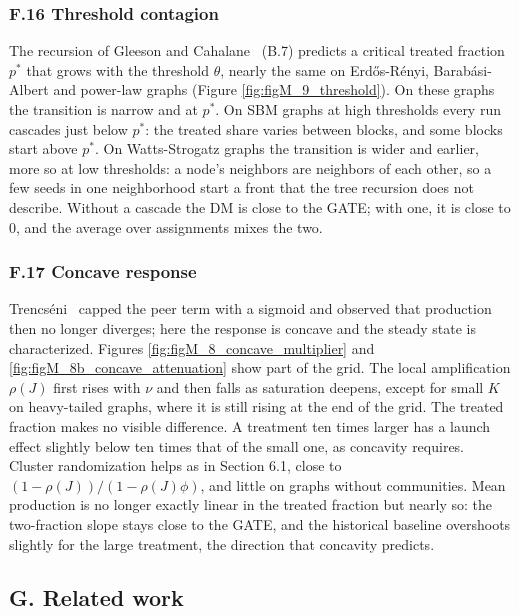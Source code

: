\documentclass[final,5p,times,twocolumn,number]{elsarticle}
\begin{document}
\subsubsection*{F.16 Threshold contagion}

The recursion of Gleeson and Cahalane~\cite{r10} (B.7) predicts a critical treated fraction $p^*$  that grows with the threshold $\theta$, nearly the same on Erdős-Rényi, Barabási-Albert and power-law graphs (Figure \ref{fig:figM_9_threshold}). On these graphs the transition is narrow and at $p^*$. On SBM graphs at high thresholds every run cascades just below $p^*$: the treated share varies between blocks, and some blocks start above $p^*$. On Watts-Strogatz graphs the transition is wider and earlier, more so at low thresholds: a node's neighbors are neighbors of each other, so a few seeds in one neighborhood start a front that the tree recursion does not describe. Without a cascade the DM is close to the GATE; with one, it is close to 0, and the average over assignments mixes the two.


\subsubsection*{F.17 Concave response}

Trencséni~\cite[Section 6]{r20} capped the peer term with a sigmoid and observed that production then no longer diverges; here the response is concave and the steady state is characterized. Figures \ref{fig:figM_8_concave_multiplier} and \ref{fig:figM_8b_concave_attenuation} show part of the grid. The local amplification $\rho(J)$  first rises with $\nu$  and then falls as saturation deepens, except for small $K$  on heavy-tailed graphs, where it is still rising at the end of the grid. The treated fraction makes no visible difference. A treatment ten times larger has a launch effect slightly below ten times that of the small one, as concavity requires. Cluster randomization helps as in Section 6.1, close to $(1 - \rho(J))/(1 - \rho(J)\phi)$, and little on graphs without communities. Mean production is no longer exactly linear in the treated fraction but nearly so: the two-fraction slope stays close to the GATE, and the historical baseline overshoots slightly for the large treatment, the direction that concavity predicts.


\subsection*{G. Related work}
\end{document}
